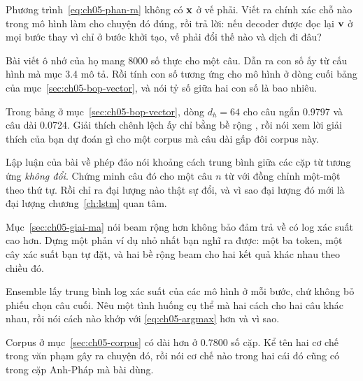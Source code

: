 \exercises

\tierunderstand

\begin{bt}
  \item Phương trình~\eqref{eq:ch05-phan-ra} không có \(\mathbf{x}\) ở vế phải.
    Viết ra chính xác chỗ nào trong mô hình làm cho chuyện đó đúng, rồi trả
    lời: nếu decoder được đọc lại \(\mathbf{v}\) ở mọi bước thay vì chỉ ở bước
    khởi tạo, vế phải đổi thế nào và  dịch đi đâu?

  \item Bài viết ô nhớ của họ mang 8000 số thực cho một câu. Dẫn ra con số ấy
    từ cấu hình mà mục 3.4 mô tả. Rồi tính con số tương ứng cho mô hình ở
    dòng cuối bảng của mục~\ref{sec:ch05-bop-vector}, và nói tỷ số giữa hai
    con số là bao nhiêu.

  \item Trong bảng ở mục~\ref{sec:ch05-bop-vector}, dòng \(d_h = 64\) cho câu
    ngắn 0.9797 và câu dài 0.0724. Giải thích chênh lệch ấy chỉ bằng bề rộng
    , rồi nói xem lời giải thích của bạn dự
    đoán gì cho một corpus mà câu dài gấp đôi corpus này.

  \item Lập luận của bài về phép đảo nói khoảng cách trung bình giữa các cặp từ
    tương ứng \emph{không đổi}. Chứng minh câu đó cho một câu \(n\) từ với
    đồng chỉnh một-một theo thứ tự. Rồi chỉ ra đại lượng nào thật sự đổi, và
    vì sao đại lượng đó mới là đại lượng chương~\ref{ch:lstm} quan tâm.

  \item Mục~\ref{sec:ch05-giai-ma} nói beam rộng hơn không bảo đảm trả về
     có log xác suất cao hơn. Dựng một phản ví dụ nhỏ nhất bạn nghĩ ra
    được: một  ba token, một cây xác suất bạn tự đặt,
    và hai bề rộng
    beam cho hai kết quả khác nhau theo chiều đó.

  \item Ensemble lấy trung bình log xác suất của các mô hình ở mỗi bước, chứ
    không bỏ phiếu chọn câu cuối. Nêu một tình huống cụ thể mà hai cách cho hai
    câu khác nhau, rồi nói cách nào khớp với \eqref{eq:ch05-argmax} hơn và vì
    sao.

  \item Corpus ở mục~\ref{sec:ch05-corpus} có 
    dài hơn  ở 0.7800 số cặp. Kể tên hai cơ chế
    trong văn phạm gây ra chuyện đó, rồi nói cơ chế nào trong hai cái đó cũng
    có trong cặp Anh-Pháp mà bài dùng.
\end{bt}

